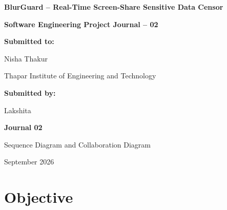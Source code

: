 \documentclass[12pt,a4paper]{article}
\begin{document}

\thispagestyle{fancy}

\vspace*{1.35cm}

\begin{center}

{\bfseries\fontsize{13}{16}\selectfont
BlurGuard -- Real-Time Screen-Share Sensitive Data Censor
}

\vspace{0.45cm}

{\bfseries\fontsize{11}{14}\selectfont
Software Engineering Project Journal -- 02
}

\vspace{1.45cm}

{\bfseries\fontsize{11}{14}\selectfont
Submitted to:
}

\vspace{0.12cm}

{\fontsize{10}{14}\selectfont
Nisha Thakur
}

{\fontsize{10}{14}\selectfont
Thapar Institute of Engineering and Technology
}

\vspace{1.45cm}

{\bfseries\fontsize{11}{14}\selectfont
Submitted by:
}

\vspace{0.12cm}

{\fontsize{10}{14}\selectfont
Lakshita
}

\vspace{8cm}

{\bfseries\fontsize{11}{14}\selectfont
Journal 02
}

\vspace{0.12cm}

{\fontsize{10}{14}\selectfont
Sequence Diagram and Collaboration Diagram
}

\vspace{0.12cm}

{\fontsize{10}{14}\selectfont
September 2026
}

\end{center}

\newpage


\section{Objective}
\end{document}
